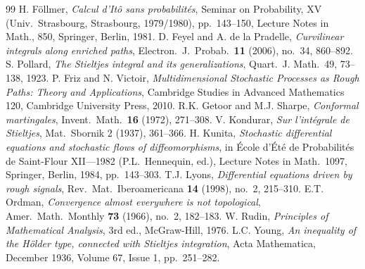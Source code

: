 \documentclass[11pt,fleqn]{article}
\theoremstyle{plain}
\theoremstyle{remark}
\begin{document}
\begin{thebibliography}{99}
H. F\"ollmer, \emph{Calcul d'It\^o sans probabilit\'es}, Seminar
on Probability, XV (Univ.\ Strasbourg, Strasbourg, 1979/1980), pp.\ 143--150,
Lecture Notes in Math., 850, Springer, Berlin, 1981.
D. Feyel and A. de la Pradelle, \emph{Curvilinear integrals
along enriched paths}, Electron.\ J.\ Probab.\ \textbf{11} (2006), no.~34,
860--892.
S. Pollard, \emph{The Stieltjes integral and its
generalizations}, Quart.\ J. Math.\ 49, 73--138, 1923.
P. Friz and N. Victoir, \emph{Multidimensional Stochastic
Processes as Rough Paths: Theory and Applications}, Cambridge Studies in
Advanced Mathematics 120, Cambridge University Press, 2010.
R.K. Getoor and M.J. Sharpe, \emph{Conformal martingales},
Invent.\ Math.\ \textbf{16} (1972), 271--308.
V. Kondurar, \emph{Sur l'int\'egrale de Stieltjes}, Mat.\
Sbornik 2 (1937), 361--366.
H. Kunita, \emph{Stochastic differential equations and
stochastic flows of diffeomorphisms}, in \'Ecole d'\'Et\'e de Probabilit\'es
de Saint-Flour XII---1982 (P.L.\ Hennequin, ed.), Lecture Notes in Math.\
1097, Springer, Berlin, 1984, pp.\ 143--303.
\bibitem{Lyons98}T.J. Lyons, \emph{Differential equations driven by rough
signals}, Rev.\ Mat.\ Iberoamericana \textbf{14} (1998), no.~2, 215--310.
\bibitem{Ordman66}E.T. Ordman, \emph{Convergence almost everywhere is not
topological}, Amer.\ Math.\ Monthly \textbf{73} (1966), no.~2, 182--183.
\bibitem{R}W. Rudin, \emph{Principles of Mathematical Analysis}, 3rd ed.,
McGraw-Hill, 1976.
\bibitem{Y}L.C. Young, \emph{An inequality of the H\"older type, connected
with Stieltjes integration}, Acta Mathematica, December 1936, Volume 67,
Issue 1, pp.\ 251--282.
\end{thebibliography}
\end{document}
